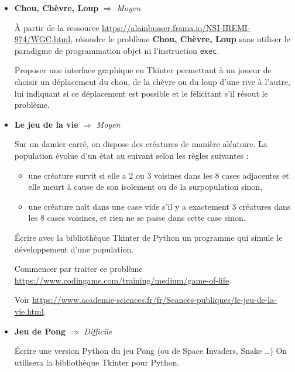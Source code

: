 \documentclass[a4paper, french, 12pt]{article}  %
\newcounter{act}
\begin{document}
\begin{itemize}

\item \textbf{Chou, Chèvre, Loup} $\Rightarrow$ \textit{Moyen}


\medskip


À partir de la ressource \url{https://alainbusser.frama.io/NSI-IREMI-974/WGC.html}, résoudre le problème \textbf{Chou, Chèvre, Loup}  sans utiliser le paradigme de programmation objet ni l'instruction \texttt{exec}.

Proposer une interface graphique en Tkinter permettant à un joueur de choisir un déplacement du  chou, de la chèvre ou du  loup d'une rive à l'autre, lui indiquant si ce déplacement est possible et le félicitant s'il résout le problème.


\bigskip

\item \textbf{Le jeu de la vie} $\Rightarrow$ \textit{Moyen}

\medskip

Sur un damier carré, on dispose des créatures de manière aléatoire. La population évolue d'un état au suivant selon les règles suivantes :
\begin{itemize}
\item une créature survit si elle a 2 ou 3 voisines dans les 8 cases adjacentes et elle meurt à cause de son isolement ou de la surpopulation sinon,
\item une créature naît dans une case vide s'il y a exactement 3 créatures dans les 8 cases voisines, et rien ne se passe dans cette case sinon.
\end{itemize}
Écrire avec la bibliothèque Tkinter de Python un  programme qui simule le développement d'une population.

Commencer par traiter ce problème \url{https://www.codingame.com/training/medium/game-of-life}.

Voir \url{https://www.academie-sciences.fr/fr/Seances-publiques/le-jeu-de-la-vie.html}.

\bigskip

\item \textbf{Jeu de Pong}   $\Rightarrow$ \textit{Difficile}

\medskip

Écrire une version Python du jeu Pong (ou de Space Invaders, Snake \ldots) On utilisera la bibliothèque Tkinter pour Python.

\bigskip




\end{itemize}
\end{document}
